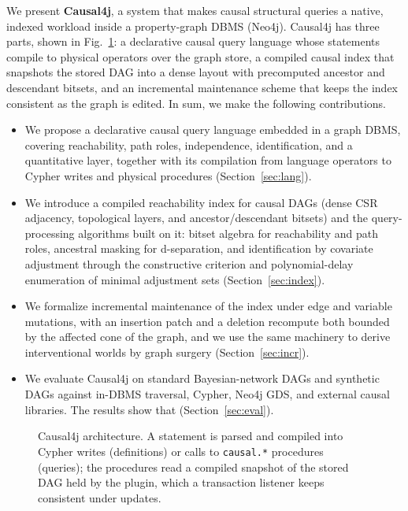 We present \textbf{Causal4j}, a system that makes causal structural queries a
native, indexed workload inside a property-graph DBMS (Neo4j). Causal4j has
three parts, shown in Fig.~\ref{fig:arch}: a declarative causal query language
whose statements compile to physical operators over the graph store, a
compiled causal index that snapshots the stored DAG into a dense layout with
precomputed ancestor and descendant bitsets, and an incremental maintenance
scheme that keeps the index consistent as the graph is edited. In sum, we make
the following contributions.
\begin{itemize}
  \item We propose a declarative causal query language embedded in a graph
  DBMS, covering reachability, path roles, independence, identification, and a
  quantitative layer, together with its compilation from language operators to
  Cypher writes and physical procedures (Section~\ref{sec:lang}).
  \item We introduce a compiled reachability index for causal DAGs (dense CSR
  adjacency, topological layers, and ancestor/descendant bitsets) and the
  query-processing algorithms built on it: bitset algebra for reachability and
  path roles, ancestral masking for d-separation, and identification by
  covariate adjustment through the constructive criterion and polynomial-delay
  enumeration of minimal adjustment sets (Section~\ref{sec:index}).
  \item We formalize incremental maintenance of the index under edge and
  variable mutations, with an insertion patch and a deletion recompute both
  bounded by the affected cone of the graph, and we use the same machinery to
  derive interventional worlds by graph surgery (Section~\ref{sec:incr}).
  \item We evaluate Causal4j on standard Bayesian-network DAGs and synthetic
  DAGs against in-DBMS traversal, Cypher, Neo4j GDS, and external causal
  libraries. The results show that 
  (Section~\ref{sec:eval}).
\end{itemize}

\begin{figure}[t]
    \centering
    \resizebox{\linewidth}{!}{}
    \caption{Causal4j architecture. A statement is parsed and compiled into
    Cypher writes (definitions) or calls to \texttt{causal.*} procedures
    (queries); the procedures read a compiled snapshot of the stored DAG held
    by the plugin, which a transaction listener keeps consistent under
    updates.}
    \label{fig:arch}
\end{figure}


